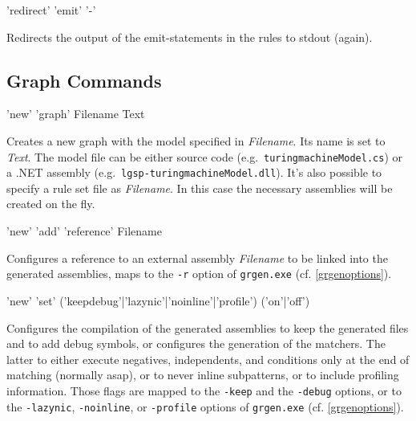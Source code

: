 \begin{rail}
'redirect' 'emit' '-'
\end{rail}
Redirects the output of the emit-statements in the rules to stdout (again).

\subsection{Graph Commands}
\label{graphcommands}

\begin{rail}
  'new' 'graph' Filename Text
\end{rail}
Creates a new graph with the model specified in \emph{Filename}.
Its name is set to \emph{Text}.
The model file can be either source code (e.g.\ \texttt{turing\textunderscore machineModel.cs}) or a .NET assembly (e.g.\ \texttt{lgsp-turing\textunderscore machineModel.dll}).
It's also possible to specify a rule set file as \emph{Filename}.
In this case the necessary assemblies will be created on the fly.

\begin{rail}
  'new' 'add' 'reference' Filename
\end{rail}
Configures a reference to an external assembly \emph{Filename} to be linked into the generated assemblies, maps to the \texttt{-r} option of \texttt{grgen.exe} (cf. \ref{grgenoptions}).

\begin{rail}
  'new' 'set' ('keepdebug'|'lazynic'|'noinline'|'profile') ('on'|'off')
\end{rail}
Configures the compilation of the generated assemblies to keep the generated files and to add debug symbols,
or configures the generation of the matchers.
The latter to either execute negatives, independents, and conditions only at the end of matching (normally asap),
or to never inline subpatterns,
or to include profiling information.
Those flags are mapped to the \texttt{-keep} and the \texttt{-debug} options, or to the \texttt{-lazynic}, \texttt{-noinline}, or  \texttt{-profile} options of \texttt{grgen.exe} (cf. \ref{grgenoptions}).

